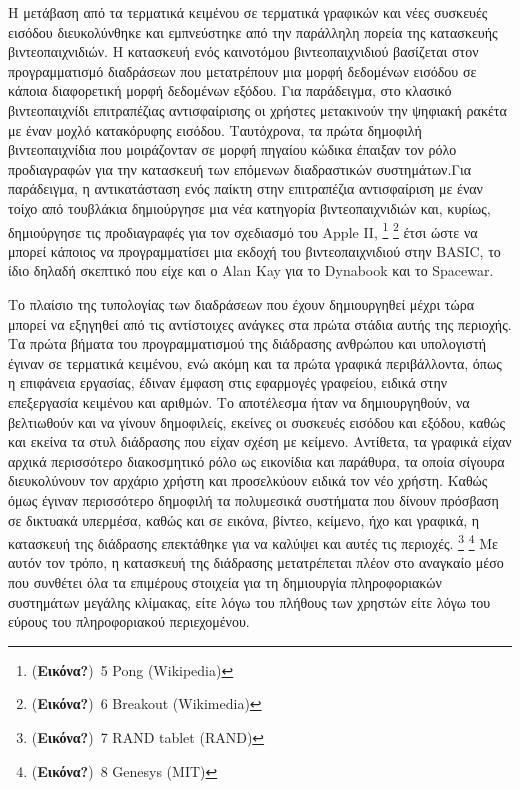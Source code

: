 \documentclass[
]{article}
\begin{document}
Η μετάβαση από τα τερματικά κειμένου σε τερματικά γραφικών και νέες
συσκευές εισόδου διευκολύνθηκε και εμπνεύστηκε από την παράλληλη πορεία
της κατασκευής βιντεοπαιχνιδιών. Η κατασκευή ενός καινοτόμου
βιντεοπαιχνιδιού βασίζεται στον προγραμματισμό διαδράσεων που
μετατρέπουν μια μορφή δεδομένων εισόδου σε κάποια διαφορετική μορφή
δεδομένων εξόδου. Για παράδειγμα, στο κλασικό βιντεοπαιχνίδι
επιτραπέζιας αντισφαίρισης οι χρήστες μετακινούν την ψηφιακή ρακέτα με
έναν μοχλό κατακόρυφης εισόδου. Ταυτόχρονα, τα πρώτα δημοφιλή
βιντεοπαιχνίδια που μοιράζονταν σε μορφή πηγαίου κώδικα έπαιξαν τον ρόλο
προδιαγραφών για την κατασκευή των επόμενων διαδραστικών συστημάτων.Για
παράδειγμα, η αντικατάσταση ενός παίκτη στην επιτραπέζια αντισφαίριση με
έναν τοίχο από τουβλάκια δημιούργησε μια νέα κατηγορία βιντεοπαιχνιδιών
και, κυρίως, δημιούργησε τις προδιαγραφές για τον σχεδιασμό του Apple
II, \footnote{(\textbf{Εικόνα?})~5 Pong (Wikipedia)} \footnote{(\textbf{Εικόνα?})~6
  Breakout (Wikimedia)} έτσι ώστε να μπορεί κάποιος να προγραμματίσει
μια εκδοχή του βιντεοπαιχνιδιού στην BASIC, το ίδιο δηλαδή σκεπτικό που
είχε και ο Alan Kay για το Dynabook και το Spacewar.

Το πλαίσιο της τυπολογίας των διαδράσεων που έχουν δημιουργηθεί μέχρι
τώρα μπορεί να εξηγηθεί από τις αντίστοιχες ανάγκες στα πρώτα στάδια
αυτής της περιοχής. Τα πρώτα βήματα του προγραμματισμού της διάδρασης
ανθρώπου και υπολογιστή έγιναν σε τερματικά κειμένου, ενώ ακόμη και τα
πρώτα γραφικά περιβάλλοντα, όπως η επιφάνεια εργασίας, έδιναν έμφαση
στις εφαρμογές γραφείου, ειδικά στην επεξεργασία κειμένου και αριθμών.
Το αποτέλεσμα ήταν να δημιουργηθούν, να βελτιωθούν και να γίνουν
δημοφιλείς, εκείνες οι συσκευές εισόδου και εξόδου, καθώς και εκείνα τα
στυλ διάδρασης που είχαν σχέση με κείμενο. Αντίθετα, τα γραφικά είχαν
αρχικά περισσότερο διακοσμητικό ρόλο ως εικονίδια και παράθυρα, τα οποία
σίγουρα διευκολύνουν τον αρχάριο χρήστη και προσελκύουν ειδικά τον νέο
χρήστη. Καθώς όμως έγιναν περισσότερο δημοφιλή τα πολυμεσικά συστήματα
που δίνουν πρόσβαση σε δικτυακά υπερμέσα, καθώς και σε εικόνα, βίντεο,
κείμενο, ήχο και γραφικά, η κατασκευή της διάδρασης επεκτάθηκε για να
καλύψει και αυτές τις περιοχές. \footnote{(\textbf{Εικόνα?})~7 RAND
  tablet (RAND)} \footnote{(\textbf{Εικόνα?})~8 Genesys (MIT)} Με αυτόν
τον τρόπο, η κατασκευή της διάδρασης μετατρέπεται πλέον στο αναγκαίο
μέσο που συνθέτει όλα τα επιμέρους στοιχεία για τη δημιουργία
πληροφοριακών συστημάτων μεγάλης κλίμακας, είτε λόγω του πλήθους των
χρηστών είτε λόγω του εύρους του πληροφοριακού περιεχομένου.
\end{document}
